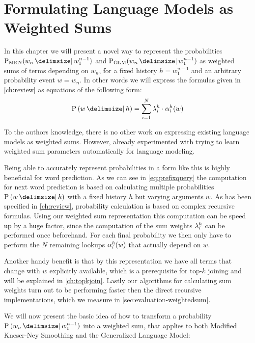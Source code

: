 \chapter{Formulating Language Models as Weighted Sums}
\label{ch:weightedsum}

In this chapter we will present a novel way to represent the probabilities
$\ProbMKN{w_n}{w_1^{n-1}}$ and $\ProbGLM{w_n}{w_1^{n-1}}$ as weighted sums of
terms depending on $w_n$, for a fixed history $h = w_1^{n-1}$ and an  arbitrary
probability event $w = w_n$.
In other words we will express the formulas given in \cref{ch:review} as
equations of the following form:
\begin{equation}
  \label{eq:weightedsum}
  \Prob{w}{h} = \sum_{i = 1}^{N} \SumWeight_i^h \cdot \SumArg_i^h(w)
\end{equation}

To the authors knowledge, there is no other work on expressing existing language
models as weighted sums.
However, \textcite{JelinekMercer1980} already experimented with trying to learn
weighted sum parameters automatically for language modeling.

Being able to accurately represent probabilities in a form like this is highly
beneficial for word prediction.
As we can see in \cref{eq:prefixquery} the computation for next word prediction
is based on calculating multiple probabilities $\Prob{w}{h}$ with a fixed
history $h$ but varying arguments $w$.
As has been specified in \cref{ch:review}, probability calculation is based on
complex recursive formulas.
Using our weighted sum representation this computation can be speed up by
a huge factor, since the computation of the sum weights $\lambda^h_i$ can
be performed once beforehand.
For each final probability we then only have to perform the $N$ remaining
lookups $\alpha^h_i(w)$ that actually depend on $w$.

Another handy benefit is that by this representation we have all terms that
change with $w$ explicitly available, which is a prerequisite for top-$k$
joining and will be explained in \cref{ch:topkjoin}.
Lastly our algorithms for calculating sum weights turn out to be performing
faster then the direct recursive implementations, which we measure in
\cref{sec:evaluation-weightedsum}.

We will now present the basic idea of how to transform a probability
$\Prob{w_n}{w_1^{n-1}}$ into a weighted sum, that applies to both Modified
Kneser-Ney Smoothing and the Generalized Language Model:

